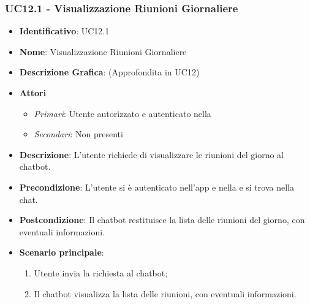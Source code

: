 \subsubsection{UC12.1 - Visualizzazione Riunioni Giornaliere }
\begin{itemize}
	\item \textbf{Identificativo}: UC12.1
	\item \textbf{Nome}: Visualizzazione Riunioni Giornaliere
	\item\textbf{Descrizione Grafica}: (Approfondita in UC12)
	\item \textbf{Attori}
	\begin{itemize} 
		\item \textit{Primari}: Utente autorizzato e autenticato nella 
		\item \textit{Secondari}: Non presenti
	\end{itemize}
	\item \textbf{Descrizione}: L'utente richiede di visualizzare le riunioni del giorno al chatbot.
	\item \textbf{Precondizione}: L'utente si è autenticato nell'app e nella  e si trova nella chat.
	\item \textbf{Postcondizione}: Il chatbot restituisce la lista delle riunioni del giorno, con eventuali informazioni.
	\item \textbf{Scenario principale}:  \begin{enumerate}
		\item Utente invia la richiesta al chatbot;
		\item Il chatbot visualizza la lista delle riunioni, con eventuali informazioni.
	\end{enumerate}
\end{itemize}

